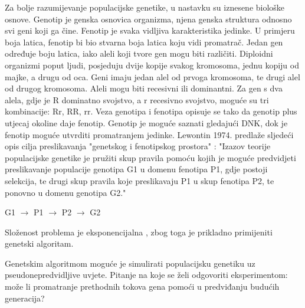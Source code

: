 \documentclass[times, utf8, zavrsni, numeric]{fer}
\begin{document}
Za bolje razumijevanje populacijske genetike, u nastavku su iznesene biološke osnove.
Genotip je genska osnovica organizma, njena genska struktura odnosno svi geni koji ga čine. Fenotip je svaka vidljiva karakteristika jedinke. U primjeru boja latica, fenotip bi bio stvarna boja latica koju vidi promatrač. Jedan gen određuje boju latica, iako aleli koji tvore gen mogu biti različiti. 
Diploidni organizmi poput ljudi, posjeduju dvije kopije svakog kromosoma, jednu kopiju od majke, a drugu od oca. Geni imaju jedan alel od prvoga kromosoma, te drugi alel od drugog kromosoma. Aleli mogu biti recesivni ili dominantni. Za gen s dva alela, gdje je R dominatno svojstvo, a r recesivno svojstvo, moguće su tri kombinacije: Rr, RR, rr. Veza genotipa i fenotipa opisuje se tako da genotip plus utjecaj okoline daje fenotip. Genotip je moguće saznati gledajući DNK, dok je fenotip moguće utvrditi promatranjem jedinke. Lewontin 1974. predlaže sljedeći opis cilja preslikavanja "genetskog i fenotipskog prostora" \cite{applicationOfBioinformatics} :\newline
"Izazov teorije populacijske genetike je pružiti skup pravila pomoću kojih je moguće predvidjeti preslikavanje populacije genotipa G1 u domenu fenotipa P1, gdje postoji selekcija, te drugi skup pravila koje preslikavaju P1 u skup fenotipa P2, te ponovno u domenu genotipa G2." 
\begin{center}
G1 $\rightarrow$ P1 $\rightarrow$ P2 $\rightarrow$ G2
\end{center}
Složenost problema je eksponencijalna \cite{applicationOfBioinformatics}, zbog toga je prikladno primijeniti genetski algoritam.

Genetskim algoritmom moguće je simulirati populacijsku genetiku uz pseudonepredvidljive uvjete. Pitanje na koje se želi odgovoriti eksperimentom: može li promatranje prethodnih tokova gena pomoći u predviđanju budućih generacija?
\end{document}
